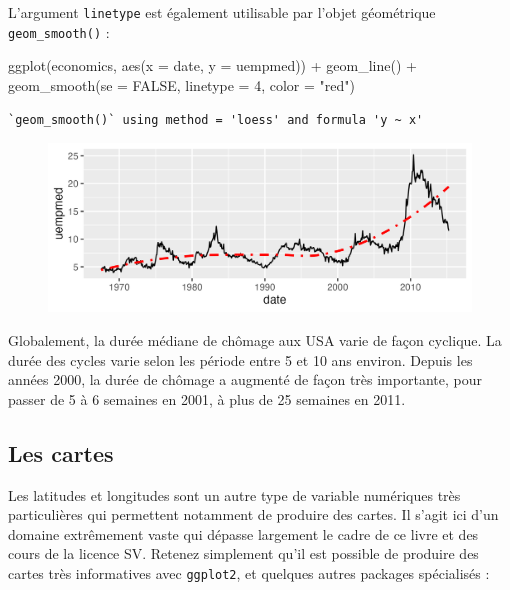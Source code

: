 \documentclass[
  letterpaper,
  DIV=11,
  numbers=noendperiod]{scrreprt}
\newenvironment{Shaded}{\begin{snugshade}}{\end{snugshade}}
\newcommand{\AttributeTok}[1]{\textcolor[rgb]{0.40,0.45,0.13}{#1}}
\newcommand{\ConstantTok}[1]{\textcolor[rgb]{0.56,0.35,0.01}{#1}}
\newcommand{\DecValTok}[1]{\textcolor[rgb]{0.68,0.00,0.00}{#1}}
\newcommand{\FunctionTok}[1]{\textcolor[rgb]{0.28,0.35,0.67}{#1}}
\newcommand{\NormalTok}[1]{\textcolor[rgb]{0.00,0.23,0.31}{#1}}
\newcommand{\SpecialCharTok}[1]{\textcolor[rgb]{0.37,0.37,0.37}{#1}}
\newcommand{\StringTok}[1]{\textcolor[rgb]{0.13,0.47,0.30}{#1}}
\begin{document}
L'argument \texttt{linetype} est également utilisable par l'objet
géométrique \texttt{geom\_smooth()} :

\begin{Shaded}
\begin{Highlighting}[]
\FunctionTok{ggplot}\NormalTok{(economics, }\FunctionTok{aes}\NormalTok{(}\AttributeTok{x =}\NormalTok{ date, }\AttributeTok{y =}\NormalTok{ uempmed)) }\SpecialCharTok{+}
  \FunctionTok{geom\_line}\NormalTok{() }\SpecialCharTok{+}
  \FunctionTok{geom\_smooth}\NormalTok{(}\AttributeTok{se =} \ConstantTok{FALSE}\NormalTok{, }\AttributeTok{linetype =} \DecValTok{4}\NormalTok{, }\AttributeTok{color =} \StringTok{"red"}\NormalTok{)}
\end{Highlighting}
\end{Shaded}

\begin{verbatim}
`geom_smooth()` using method = 'loess' and formula 'y ~ x'
\end{verbatim}

\begin{figure}[H]

{\centering \includegraphics{./03-visualization_files/figure-pdf/unnamed-chunk-53-1.png}

}

\end{figure}

Globalement, la durée médiane de chômage aux USA varie de façon
cyclique. La durée des cycles varie selon les période entre 5 et 10 ans
environ. Depuis les années 2000, la durée de chômage a augmenté de façon
très importante, pour passer de 5 à 6 semaines en 2001, à plus de 25
semaines en 2011.

\hypertarget{les-cartes}{%
\subsection{Les cartes}\label{les-cartes}}

Les latitudes et longitudes sont un autre type de variable numériques
très particulières qui permettent notamment de produire des cartes. Il
s'agit ici d'un domaine extrêmement vaste qui dépasse largement le cadre
de ce livre et des cours de la licence SV. Retenez simplement qu'il est
possible de produire des cartes très informatives avec \texttt{ggplot2},
et quelques autres packages spécialisés :
\end{document}
